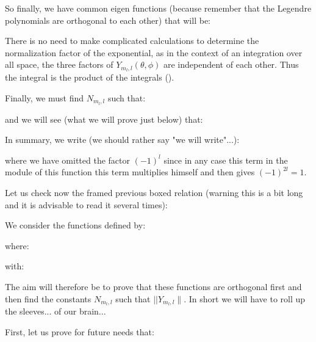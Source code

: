 	So finally, we have common eigen functions (because remember that the Legendre polynomials are orthogonal to each other) that will be:
	 
	\begin{tcolorbox}[title=Remark,arc=10pt,breakable,drop lifted shadow,
  skin=enhanced,
  skin first is subskin of={enhancedfirst}{arc=10pt,no shadow},
  skin middle is subskin of={enhancedmiddle}{arc=10pt,no shadow},
  skin last is subskin of={enhancedlast}{drop lifted shadow}]
	There is no need to make complicated calculations to determine the normalization factor of the exponential, as in the context of an integration over all space, the three factors of $Y_{m_l,l}(\theta,\phi)$ are independent of each other. Thus the integral is the product of the integrals ().
	\end{tcolorbox}
	Finally, we must find $N_{m_l,l}$ such that:
	
	and we will see (what we will prove just below) that:
	
	In summary, we write (we should rather say "we will write"...):
	
	where we have omitted the factor $(-1)^l$ since in any case this term in the module of this function this term multiplies himself and then gives $(-1)^{2l}=1$.

Let us check now the framed previous boxed relation (warning this is a bit long and it is advisable to read it several times):

	We consider the functions defined by:
	
	where:
	
	with:
	
	The aim will therefore be to prove that these functions are orthogonal first and then find the constants $N_{m_l,l}$ such that $||Y_{m_l,l}\|$. In short we will have to roll up the sleeves... of our brain...

	First, let us prove for future needs that:
	
